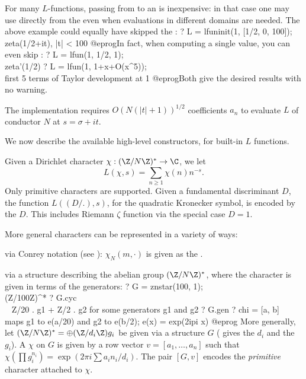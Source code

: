 For many $L$-functions, passing from  to an  is
inexpensive: in that case one may use  directly from the
 even when evaluations in different domains are needed. The
above example could equally have skipped the :
\bprog
? L = lfuninit(1, [1/2, 0, 100]); \\ zeta(1/2+it), |t| < 100
@eprog\noindent In fact, when computing a single value, you can even skip
:
\bprog
? L = lfun(1, 1/2, 1); \\ zeta'(1/2)
? L = lfun(1, 1+x+O(x^5)); \\ first 5 terms of Taylor development at 1
@eprog\noindent Both give the desired results with no warning.

The implementation requires $O(N(|t|+1))^{1/2}$ coefficients $a_n$
to evaluate $L$ of conductor $N$ at $s = \sigma + i t$.

We now describe the available high-level constructors, for built-in $L$
functions.


Given a Dirichlet character $\chi:(\Z/N\Z)^*\to \C$, we let
$$L(\chi, s) = \sum_{n\geq 1} \chi(n) n^{-s}.$$
Only primitive characters are supported. Given a fundamental discriminant
$D$, the function $L((D/.), s)$, for the quadratic Kronecker symbol, is encoded
by the  $D$. This includes Riemann $\zeta$ function via the special
case $D = 1$.

More general characters can be represented in a variety of ways:

\item via Conrey notation (see ): $\chi_N(m,\cdot)$
is given as the  .

\item via a  structure describing the abelian  group $(\Z/N\Z)^*$,
where the character is given in terms of the  generators:
\bprog
  ? G = znstar(100, 1); \\ (Z/100Z)^*
  ? G.cyc \\ ~ Z/20 . g1  + Z/2 . g2 for some generators g1 and g2
  ? G.gen
  ? chi = [a, b]  \\ maps g1 to e(a/20) and g2 to e(b/2);  e(x) = exp(2ipi x)
@eprog\noindent
More generally, let $(\Z/N\Z)^* = \oplus (\Z/d_i\Z) g_i$ be given via a
 structure $G$ ( gives the $d_i$ and  the
$g_i$). A  $\chi$ on $G$ is given by a row vector
$v = [a_1,\ldots,a_n]$ such that $\chi(\prod g_i^{n_i}) = \exp(2\pi i\sum a_i
n_i / d_i)$. The pair $[G, v]$ encodes the \emph{primitive} character
attached to $\chi$.

